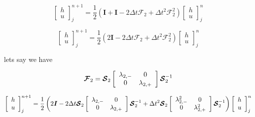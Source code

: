 \documentclass[12pt]{article}
\begin{document}
\[\left[\begin{array}{c}
h \\ u
\end{array}\right]^{n+1}_j = \frac{1}{2} \left(\boldsymbol{I} +  \boldsymbol{I} -2\Delta t\boldsymbol{\mathcal{F}}_2 + \Delta t^2\boldsymbol{\mathcal{F}}_2^2 \right) \left[\begin{array}{c}
h \\ u
\end{array}\right]^{n}_j  \]

\[\left[\begin{array}{c}
h \\ u
\end{array}\right]^{n+1}_j = \frac{1}{2} \left(2\boldsymbol{I}  -2\Delta t\boldsymbol{\mathcal{F}}_2 + \Delta t^2\boldsymbol{\mathcal{F}}^2_2 \right) \left[\begin{array}{c}
h \\ u
\end{array}\right]^{n}_j  \]

lets say we have 

\[\boldsymbol{\mathcal{F}}_2 = \boldsymbol{\mathcal{S}}_2 \left[\begin{array}{c c}
\lambda_{2,-}  & 0 \\0  & \lambda_{2,+}
\end{array}\right] \boldsymbol{\mathcal{S}}_2^{-1}  \]

\[\left[\begin{array}{c}
h \\ u
\end{array}\right]^{n+1}_j = \frac{1}{2} \left(2\boldsymbol{I}  -2\Delta t\boldsymbol{\mathcal{S}}_2 \left[\begin{array}{c c}
\lambda_{2,-}  & 0 \\0  & \lambda_{2,+}
\end{array}\right] \boldsymbol{\mathcal{S}}_2^{-1} + \Delta t^2\boldsymbol{\mathcal{S}}_2 \left[\begin{array}{c c}
\lambda_{2,-}^2  & 0 \\0  & \lambda_{2,+}^2
\end{array}\right] \boldsymbol{\mathcal{S}}_2^{-1} \right) \left[\begin{array}{c}
h \\ u
\end{array}\right]^{n}_j  \]
\end{document}
